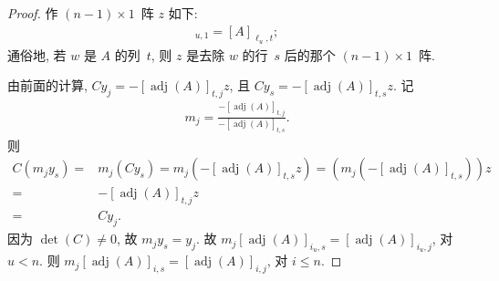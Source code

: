 \begin{proof}
    作 \((n-1) \times 1\)~阵 \(z\) 如下:
    \begin{align*}
        [z]_{u,1} = [A]_{\ell_u,t};
    \end{align*}
    通俗地, 若 \(w\) 是 \(A\) 的列~\(t\),
    则 \(z\) 是去除 \(w\) 的行~\(s\) 后的那个
    \((n-1) \times 1\)~阵.

    由前面的计算,
    \(C y_j = -[\operatorname{adj} {(A)}]_{t,j} z\),
    且
    \(C y_s = -[\operatorname{adj} {(A)}]_{t,s} z\).
    记
    \begin{align*}
        m_j =
        \frac{-[\operatorname{adj} {(A)}]_{t,j}}
        {-[\operatorname{adj} {(A)}]_{t,s}}.
    \end{align*}
    则
    \begin{align*}
        C (m_j y_s)
        = {} & m_j (C y_s)
        = m_j (-[\operatorname{adj} {(A)}]_{t,s} z)
        = (m_j (-[\operatorname{adj} {(A)}]_{t,s})) z
        \\
        = {} &
        {-[\operatorname{adj} {(A)}]_{t,j} z}
        \\
        = {} &
        C y_j.
    \end{align*}
    因为 \(\det {(C)} \neq 0\),
    故 \(m_j y_s = y_j\).
    故 \(m_j [\operatorname{adj} {(A)}]_{i_u,s}
        = [\operatorname{adj} {(A)}]_{i_u,j}\),
    对 \(u < n\).
    则 \(m_j [\operatorname{adj} {(A)}]_{i,s}
        = [\operatorname{adj} {(A)}]_{i,j}\),
    对 \(i \leq n\).
\end{proof}

